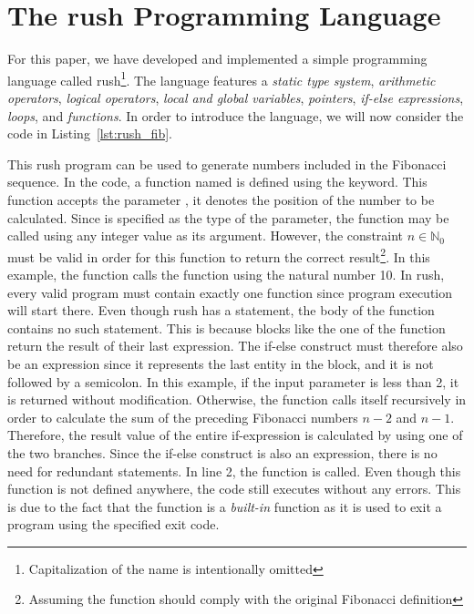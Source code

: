 \newpage %
\section{The rush Programming Language}

For this paper, we have developed and implemented a simple programming language called rush\footnote{Capitalization of the name is intentionally omitted}.
The language features a \emph{static type system}, \emph{arithmetic operators}, \emph{logical operators}, \emph{local and global variables}, \emph{pointers}, \emph{if-else expressions}, \emph{loops}, and \emph{functions}.
In order to introduce the language, we will now consider the code in Listing~\ref{lst:rush_fib}.


This rush program can be used to generate numbers included in the Fibonacci sequence.
In the code, a function named  is defined using the  keyword.
This function accepts the parameter , it denotes the position of the number to be calculated.
Since  is specified as the type of the parameter, the function may be called using any integer value as its argument.
However, the constraint $n \in \mathbb{N}_0$ must be valid in order for this function to return the correct result\footnote{Assuming the function should comply with the original Fibonacci definition}.
In this example, the  function calls the  function using the natural number 10.
In rush, every valid program must contain exactly one  function since program execution will start there.
Even though rush has a  statement, the body of the  function contains no such statement.
This is because blocks like the one of the function  return the result of their last expression.
The if-else construct must therefore also be an expression since it represents the last entity in the block, and it is not followed by a semicolon.
In this example, if the input parameter  is less than 2, it is returned without modification.
Otherwise, the function calls itself recursively in order to calculate the sum of the preceding Fibonacci numbers $n - 2$ and $n - 1$.
Therefore, the result value of the entire if-expression is calculated by using one of the two branches.
Since the if-else construct is also an expression, there is no need for redundant  statements.
In line 2, the  function is called.
Even though this function is not defined anywhere, the code still executes without any errors.
This is due to the fact that the  function is a \emph{built-in} function as it is used to exit a program using the specified exit code.

